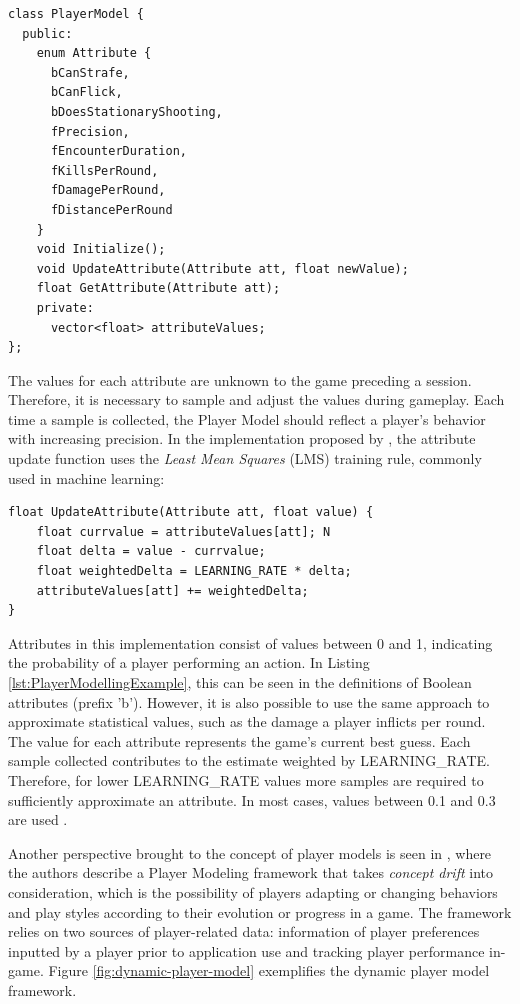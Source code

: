 \documentclass[cic,tc,english]{iiufrgs}
\begin{document}
\begin{lstlisting}[caption={Example of a Player Model for a shooter game.},label={lst:PlayerModellingExample}]
class PlayerModel {
  public:
    enum Attribute {
      bCanStrafe,
      bCanFlick,
      bDoesStationaryShooting,
      fPrecision,
      fEncounterDuration,
      fKillsPerRound,
      fDamagePerRound,
      fDistancePerRound
    }
    void Initialize();
    void UpdateAttribute(Attribute att, float newValue);
    float GetAttribute(Attribute att);
    private:
      vector<float> attributeValues;
};
\end{lstlisting}

The values for each attribute are unknown to the game preceding a session. Therefore, it is necessary to sample and adjust the values during gameplay. Each time a sample is collected, the Player Model should reflect a player's behavior with increasing precision. In the implementation proposed by \citet{BOOK_PlayerModeling}, the attribute update function uses the \emph{Least Mean Squares} (LMS) training rule, commonly used in machine learning:

\begin{lstlisting}[caption={Implementation of attribute update using least mean squares.},label={lst:AttributeUpdate}]
float UpdateAttribute(Attribute att, float value) {
    float currvalue = attributeValues[att]; N
    float delta = value - currvalue;
    float weightedDelta = LEARNING_RATE * delta;
    attributeValues[att] += weightedDelta;
}
\end{lstlisting}

Attributes in this implementation consist of values between 0 and 1, indicating the probability of a player performing an action. In Listing \ref{lst:PlayerModellingExample}, this can be seen in the definitions of Boolean attributes (prefix 'b'). However, it is also possible to use the same approach to approximate statistical values, such as the damage a player inflicts per round. The value for each attribute represents the game's current best guess. Each sample collected contributes to the estimate weighted by LEARNING\_RATE. Therefore, for lower LEARNING\_RATE values more samples are required to sufficiently approximate an attribute. In most cases, values between 0.1 and 0.3 are used \cite{BOOK_PlayerModeling}.

Another perspective brought to the concept of player models is seen in \cite{ARTICLE_DynamicPlayerModelling}, where the authors describe a Player Modeling framework that takes \emph{concept drift} into consideration, which is the possibility of players adapting or changing behaviors and play styles according to their evolution or progress in a game. The framework relies on two sources of player-related data: information of player preferences inputted by a player prior to application use and tracking player performance in-game. Figure \ref{fig:dynamic-player-model} exemplifies the dynamic player model framework.
\end{document}
